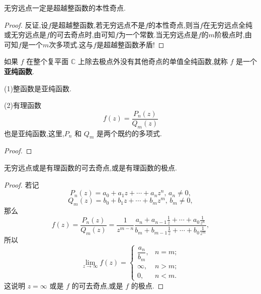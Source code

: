 \documentclass[../../main.tex]{subfiles}%
\begin{document}
\begin{proposition}
无穷远点一定是超越整函数的本性奇点.
\end{proposition}
\begin{proof}

反证,设$f$是超越整函数,若无穷远点不是$f$的本性奇点,则当$f$在无穷远点全纯或无穷远点是$f$的可去奇点时,由可知$f$为一个常数.当无穷远点是$f$的$m$阶极点时,由可知$f$是一个$m$次多项式.这与$f$是超越整函数矛盾!

\end{proof}


\begin{definition}
如果 \( f \) 在整个复平面 \( \mathbb{C} \) 上除去极点外没有其他奇点的单值全纯函数,就称 \( f \) 是一个\textbf{亚纯函数}.
\end{definition}

\begin{proposition}
(1)整函数是亚纯函数.

(2)有理函数
\[
f(z) = \frac{P_n(z)}{Q_m(z)}
\]
也是亚纯函数,这里,\( P_n \) 和 \( Q_m \) 是两个既约的多项式.
\end{proposition}
\begin{proof}



\end{proof}

\begin{proposition}
无穷远点或是有理函数的可去奇点,或是有理函数的极点.
\end{proposition}
\begin{proof}

若记
\[
P_n(z) = a_0 + a_1 z + \cdots + a_n z^n, \, a_n \neq 0,
\]
\[
Q_m(z) = b_0 + b_1 z + \cdots + b_m z^m, \, b_m \neq 0,
\]
那么
\[
f(z) = \frac{P_n(z)}{Q_m(z)} = \frac{1}{z^{m - n}} \frac{a_n + a_{n - 1} \frac{1}{z} + \cdots + a_0 \frac{1}{z^n}}{b_m + b_{m - 1} \frac{1}{z} + \cdots + b_0 \frac{1}{z^m}},
\]
所以
\[
\lim_{z \to \infty} f(z) = \begin{cases} 
\dfrac{a_n}{b_m}, & n = m; \\
\infty, & n > m; \\
0, & n < m.
\end{cases}
\]
这说明 \( z = \infty \) 或是 \( f \) 的可去奇点,或是 \( f \) 的极点.

\end{proof}
\end{document}
